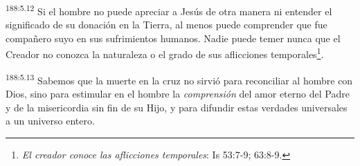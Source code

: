 \par
\textsuperscript{188:5.12} Si el hombre no puede apreciar a Jesús de otra manera ni entender el significado de su donación en la Tierra, al menos puede comprender que fue compañero suyo en sus sufrimientos humanos. Nadie puede temer nunca que el Creador no conozca la naturaleza o el grado de sus aflicciones temporales\footnote{\textit{El creador conoce las aflicciones temporales}: Is 53:7-9; 63:8-9.}.

\par
\textsuperscript{188:5.13} Sabemos que la muerte en la cruz no sirvió para reconciliar al hombre con Dios, sino para estimular en el hombre la \textit{comprensión} del amor eterno del Padre y de la misericordia sin fin de su Hijo, y para difundir estas verdades universales a un universo entero.